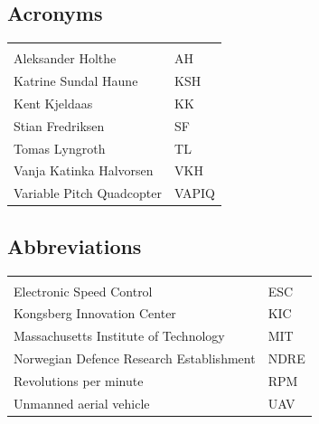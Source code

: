 \documentclass{article}
\begin{document}
\vspace*{2.0 cm}

\begin{center}
\section*{\textbf{Acronyms}}
\begin{tabular}{ll}
\rowcolor{cadetgrey}
    &   \\
Aleksander Holthe      & AH     
 \\\rowcolor{gainsboro}
Katrine Sundal Haune  & KSH \\
Kent Kjeldaas         & KK 
 \\\rowcolor{gainsboro}
Stian Fredriksen      & SF  \\
Tomas Lyngroth       & TL   
 \\\rowcolor{gainsboro}
Vanja Katinka Halvorsen     & VKH   \\
Variable Pitch Quadcopter   & VAPIQ
\end{tabular}                                                             
\end{center}

\vspace*{2.0 cm}

\begin{center}
\section*{\textbf{Abbreviations}}
\begin{tabular}{ll}
\rowcolor{cadetgrey}
    &   \\
Electronic Speed Control      & ESC          \\\rowcolor{gainsboro}
Kongsberg Innovation Center & KIC \\
Massachusetts Institute of Technology       & MIT
\\\rowcolor{gainsboro}
Norwegian Defence Research Establishment   & NDRE \\
Revolutions per minute      & RPM         
\\\rowcolor{gainsboro}
Unmanned aerial vehicle     & UAV   \\
\end{tabular}                                                             
\end{center}
\newpage

\end{document}
